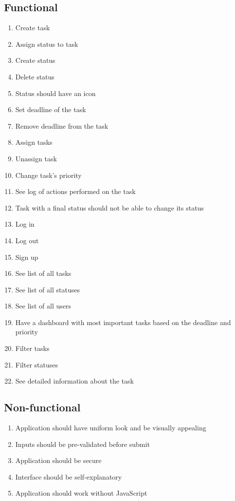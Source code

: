 \documentclass{article}
\begin{document}
\subsection{Functional}
\begin{enumerate}[label=\textbf{FR\arabic*}]
    \item Create task
    \item Assign status to task
    \item Create status
    \item Delete status
    \item Status should have an icon
    \item Set deadline of the task
    \item Remove deadline from the task
    \item Assign tasks
    \item Unassign task
    \item Change task's priority
    \item See log of actions performed on the task
    \item Task with a final status should not be able to change its status
    \item Log in
    \item Log out
    \item Sign up
    \item See list of all tasks
    \item See list of all statuses
    \item See list of all users
    \item Have a dashboard with most important tasks based on the deadline and priority
    \item Filter tasks
    \item Filter statuses
    \item See detailed information about the task
\end{enumerate}
\subsection{Non-functional}
\begin{enumerate}[label=\textbf{IR\arabic*}]
    \item Application should have uniform look and be visually appealing
    \item Inputs should be pre-validated before submit
    \item Application should be secure
    \item Interface should be self-explanatory
    \item Application should work without JavaScript
\end{enumerate}
\end{document}

